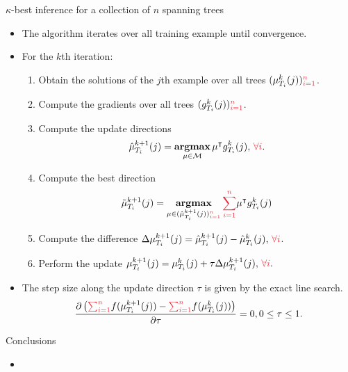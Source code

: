 \documentclass[first=dgreen,second=purple,logo=yellowexc]{aaltoslides}
\begin{document}
\begin{frame}{$\kappa$-best inference for a collection of $n$ spanning trees}
	\begin{itemize}\footnotesize
		\item The algorithm iterates over all training example until convergence.
		\item For the $k$th iteration:
		\begin{enumerate}\footnotesize
			\item Obtain the solutions of the $j$th example over all trees $(\vmu_{T_i}^k(j)){\color{aaltored}_{i=1}^n}$.
			\item Compute the gradients over all trees $(g_{T_i}^k(j)){\color{aaltored}_{i=1}^n}$.
			\item Compute the update directions
			\begin{align*}
				\hat{\vmu}_{T_i}^{k+1}(j) = \underset{\vmu\in\Mcal}{\argmax}\,\vmu\tp g_{T_i}^k(j),\,{\color{aaltored}\forall i}.
			\end{align*}
			\item Compute the best direction
			\begin{align*}
				\tilde{\vmu}_{T_i}^{k+1}(j) = \underset{\vmu\in(\hat{\vmu}_{T_i}^{k+1}(j)){\color{aaltored}_{i=1}^n}}{\argmax}\,{\color{aaltored}\sum_{i=1}^n}\vmu\tp g_{T_i}^k(j)
			\end{align*}
			\item Compute the difference $\Delta\vmu_{T_i}^{k+1}(j) = \hat{\vmu}_{T_i}^{k+1}(j) - \hat{\vmu}_{T_i}^{k}(j),\,{\color{aaltored}\forall i}$.
			\item Perform the update $\vmu_{T_i}^{k+1}(j) = \vmu_{T_i}^k(j) + \tau\Delta\vmu_{T_i}^{k+1}(j),\,{\color{aaltored}\forall i}.$
		\end{enumerate}
		\item The step size along the update direction $\tau$ is given by the exact line search.
		\begin{align*}\footnotesize
			\frac{\partial \left({\color{aaltored}\sum_{i=1}^n}f(\vmu_{T_i}^{k+1}(j))-{\color{aaltored}\sum_{i=1}^n}f(\vmu_{T_i}^k(j))\right)}{\partial \tau} = 0, 0\le\tau\le1.
		\end{align*}
	\end{itemize}
\end{frame}

%
\begin{frame}{Conclusions}
	\begin{itemize}\footnotesize
		\item 
	\end{itemize}
\end{frame}




\iffalse
\begin{frame}[allowframebreaks]{Bibliography}
	
	
\end{frame}
\fi
\end{document}
